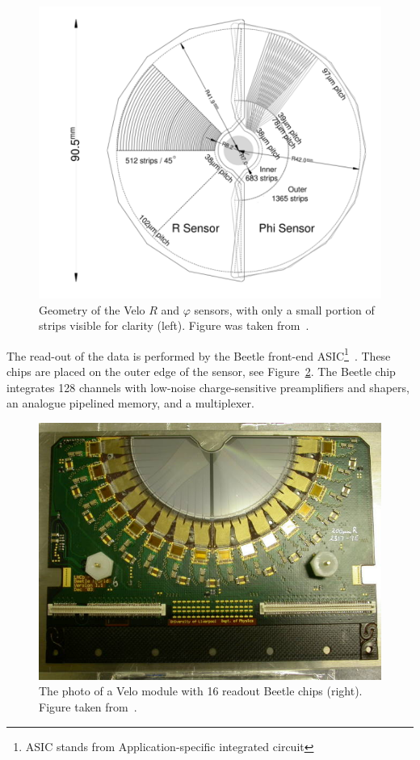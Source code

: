 \begin{figure}[h]
 \begin{center}
  \includegraphics[width=0.8\linewidth]{figures/VeloGeometry.PNG}
   \caption{Geometry of the Velo $R$ and  $\varphi$ sensors, with only a small portion of strips visible for clarity (left). 
   Figure was taken from~\cite{lhcb}.  
     \label{fig:velo}}
 \end{center}
\end{figure}

The read-out of the data is performed by the Beetle front-end ASIC\footnote{ASIC stands from Application-specific integrated circuit}~\cite{Beetle}. These chips are placed on the outer edge of the sensor, see Figure~\ref{fig:velo1}. The Beetle chip integrates 128 channels with low-noise charge-sensitive preamplifiers and shapers, an analogue pipelined memory, and a multiplexer.

\begin{figure}[h]
 \begin{center}
   \includegraphics[width=0.6\linewidth]{figures/Velo_photo.jpg}
   \caption{
   The photo of a Velo module with 16 readout Beetle chips (right). 
   Figure taken from~\cite{lhcb}.  
     \label{fig:velo1}}
 \end{center}
\end{figure}

